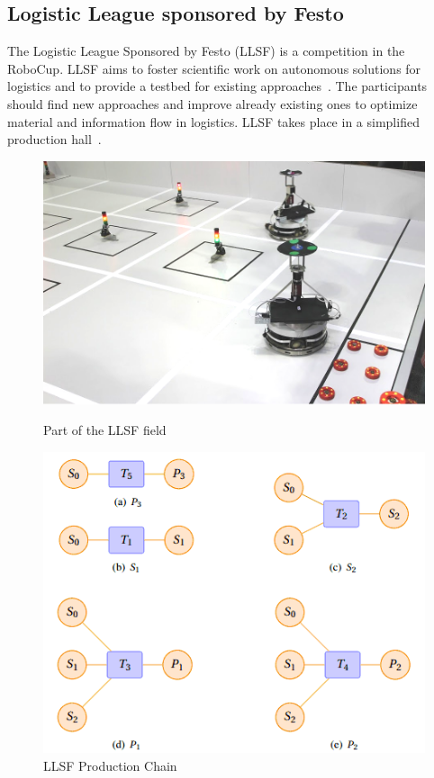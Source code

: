 \subsection{Logistic League sponsored by Festo}
The Logistic League Sponsored by Festo (LLSF) is a competition in the RoboCup. LLSF aims to foster scientific work on autonomous solutions for logistics and to provide a testbed for existing approaches~\cite{LLSFTestbed}. The participants should find new approaches and improve already existing ones to optimize material and information flow in logistics.
LLSF takes place  in a simplified production hall~\cite{LLSFRules}.
\begin{figure}
\begin{minipage}[b]{0.5\linewidth}
\includegraphics[scale=0.23]{pics/llsf}
\caption{Part of the LLSF field}
\label{fig:llsf_field}
\end{minipage}
\quad
\begin{minipage}[b]{0.5\linewidth}
\includegraphics[scale=0.45]{pics/production_chain}
\caption{LLSF Production Chain~\cite{LLSFRules}}
\label{fig:llsf_chain}
\end{minipage}
\end{figure}
